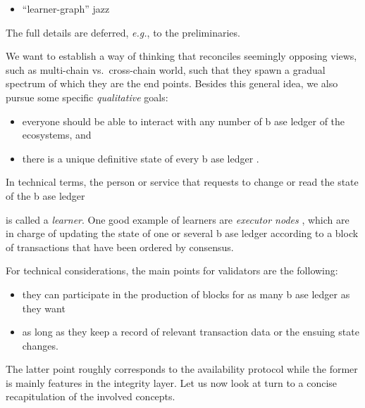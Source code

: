 \documentclass[%
dvipsnames]{article}
\theoremstyle{definition}
\newcommand{\base}[1][ ]{%
  b\ase[#1]%
}
\newcommand{\ase}[1][ ]{%
  ase ledger%
  \ifthenelse{\equal{#1}{ }}{}{#1}\xspace%
}
\newcommand{\eg}[1][, ]{\emph{e.g.}#1}
\begin{document}
{\begin{itemize}
{\begin{quote}
        “what is the least ordering we actually need?”
        \\…\\
        Charlotte provides a common framework for data structures from separate
        services to \ul{reference each other}.
        \\…\\
        Charlotte data structures are naturally composable: the \emph{union} of two data structures is itself a
        data structure
        \\…\\
        the \emph{intersection} of two data
        structures comprises the data that is part of both structures. We can think of \ul{cross-shard} transactions
        appended to a sharded blockchain ADDS as data in the intersection of multiple shard ADDSs.
      \end{quote}
    }%
  \item “learner-graph” jazz
  \end{itemize}
  The full details are deferred,
  \eg to the preliminaries. 
}



We want to establish a way of thinking that reconciles  %
seemingly opposing views, such as multi-chain vs.\ cross-chain world, %
such that they spawn a gradual spectrum of which they are the end points. %
Besides this general idea, %
we also pursue some specific \emph{qualitative} goals: %
\begin{itemize} %
  
\item everyone should be able to  interact with any number of \base[s] of the ecosystems, %
  and %
\item there is a unique definitive state of every \base.
\end{itemize}
In technical terms, %
the person or service that requests to change or read the state of the \base[s]
is called a \emph{learner}. %
One good example of learners are \emph{executor nodes} %
\cite{anomaSpecs}, %
which are in charge of updating the state of one or several \base[s] %
according to a block of transactions that have been ordered by consensus. %

For technical considerations,
the main points for validators are the following:
\begin{itemize}
\item %
  they can participate in the production of blocks for %
  as many \base[s] as they want %
\item %
  as long as they keep a record of relevant %
  transaction data or the ensuing state changes. %
\end{itemize}
The latter point roughly corresponds to the availability protocol %
while the former is mainly features in the integrity layer. %
Let us now look at turn to a concise recapitulation of the involved concepts. %
\end{document}
